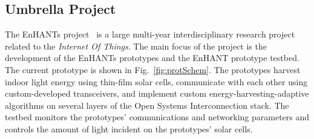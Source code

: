 \documentclass[journal,twopages]{IEEEtran}
\begin{document}
\subsection{Umbrella Project}





The EnHANTs proj\-ect~\cite{EnHANTsProject} is a large multi-year interdisciplinary research project related to the \emph{Internet Of Things}. The main focus of the project is the development of the EnHANTs prototypes and the EnHANT prototype testbed. The current prototype is shown in Fig.~\ref{fig:protSchem}.
The prototypes harvest indoor light energy using thin-film solar cells, communicate with each other using \mbox{custom-developed} transceivers, and implement custom energy-harve\-sting-adaptive algorithms on several layers of the Open Systems Interconnection stack. The testbed monitors the prototypes' communications and networking parameters and controls the amount of light incident on the prototypes' solar cells.
\end{document}
